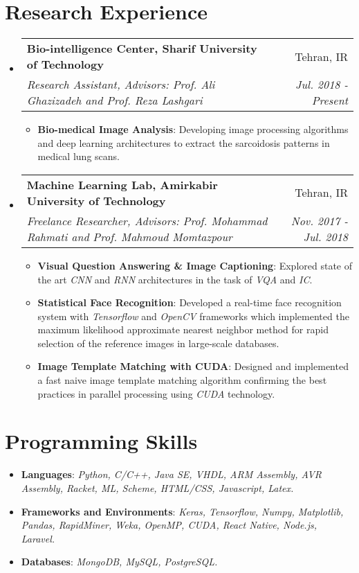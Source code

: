 \documentclass[letterpaper,11pt]{article}
\makeatletter
\newcommand{\resumeItem}[2]{
  \item\small{
    \textbf{#1}{: #2 \vspace{-2pt}}
  }
}
\newcommand{\resumeSubheading}[4]{
  \vspace{-1pt}\item
    \begin{tabular*}{0.97\textwidth}{l@{\extracolsep{\fill}}r}
      \textbf{#1} & #2 \\
      \textit{\small#3} & \textit{\small #4} \\
    \end{tabular*}\vspace{-5pt}
}
\newcommand{\resumeSubHeadingListStart}{\begin{itemize}[leftmargin=*]}
\newcommand{\resumeSubHeadingListEnd}{\end{itemize}}
\newcommand{\resumeItemListStart}{\begin{itemize}}
\newcommand{\resumeItemListEnd}{\end{itemize}\vspace{-5pt}}
\makeatother
\begin{document}
\section{Research Experience}
  \resumeSubHeadingListStart

    \resumeSubheading
      {Bio-intelligence Center, Sharif University of Technology}{Tehran, IR}
      {Research Assistant, Advisors: Prof. Ali Ghazizadeh and Prof. Reza Lashgari}{Jul. 2018 - Present}
      \resumeItemListStart
        \resumeItem{Bio-medical Image Analysis}
          {Developing image processing algorithms and deep learning architectures to extract the sarcoidosis patterns in medical lung scans.}
      \resumeItemListEnd
      \vspace{0.2cm}
    \resumeSubheading
    {Machine Learning Lab, Amirkabir University of Technology}{Tehran, IR}
    {Freelance Researcher, Advisors: Prof. Mohammad Rahmati and Prof. Mahmoud Momtazpour}{Nov. 2017 - Jul. 2018}
    \resumeItemListStart
    \resumeItem{Visual Question Answering \& Image Captioning}
    {Explored state of the art \textit{CNN} and \textit{RNN} architectures in the task of \textit{VQA} and \textit{IC}.}
    \resumeItem{Statistical Face Recognition}
    {Developed a real-time face recognition system with \textit{Tensorflow} and \textit{OpenCV} frameworks which implemented the maximum likelihood approximate nearest neighbor method for rapid selection of the reference images in large-scale databases.}
    \resumeItem{Image Template Matching with CUDA}
    {Designed and implemented a fast naive image template matching algorithm confirming the best practices in parallel processing using \textit{CUDA} technology.}
    \resumeItemListEnd

  \resumeSubHeadingListEnd

\section{Programming Skills}
\resumeSubHeadingListStart
\item{
	\textbf{Languages}{: \textit{Python, C/C++, Java SE, VHDL, ARM Assembly, AVR Assembly, Racket, ML, Scheme, HTML/CSS, Javascript, Latex.}}
	\hfill
}
\item{
	\textbf{Frameworks and Environments}{: \textit{Keras, Tensorflow, Numpy, Matplotlib, Pandas, RapidMiner, Weka, OpenMP, CUDA, React Native, Node.js, Laravel.}}
	\hfill
}
\item{
	\textbf{Databases}{: \textit{MongoDB, MySQL, PostgreSQL.}}
	\hfill
}
\resumeSubHeadingListEnd
\end{document}
